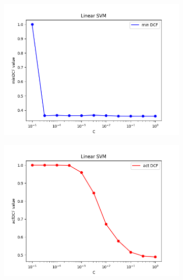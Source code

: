 \begin{figure}[h!]
    \centering
    \begin{subfigure}[b]{0.30\linewidth}
        \includegraphics[width=\linewidth]{Lab/09. Lab 09/Images/01. L - minDCF}
        \label{fig:LminDCF}
    \end{subfigure}
    \begin{subfigure}[b]{0.30\linewidth}
        \includegraphics[width=\linewidth]{Lab/09. Lab 09/Images/02. L - actDCF}
        \label{fig:LactDCF}
    \end{subfigure}
    \begin{subfigure}[b]{0.30\linewidth}

\end{subfigure}
\end{figure}

